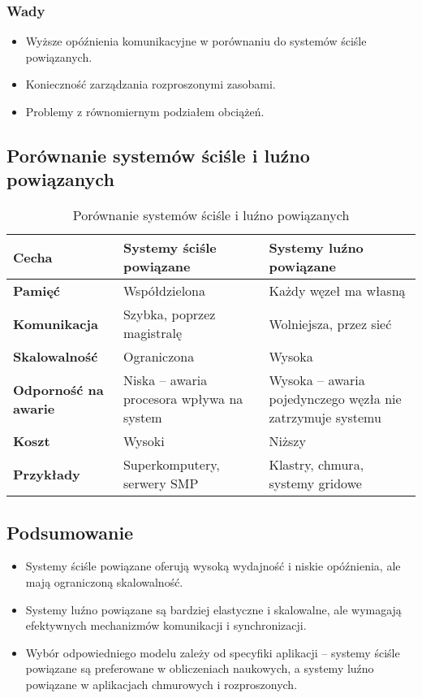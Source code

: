 \subsubsection{Wady}
\begin{itemize}
    \item Wyższe opóźnienia komunikacyjne w porównaniu do systemów ściśle powiązanych.
    \item Konieczność zarządzania rozproszonymi zasobami.
    \item Problemy z równomiernym podziałem obciążeń.
\end{itemize}

\subsection{Porównanie systemów ściśle i luźno powiązanych}

\begin{table}[h]
    \centering
    \renewcommand{\arraystretch}{1.3} %
    \begin{tabularx}{\textwidth}{|l|X|X|}
        \hline
        \textbf{Cecha} & \textbf{Systemy ściśle powiązane} & \textbf{Systemy luźno powiązane} \\
        \hline
        \textbf{Pamięć} & Współdzielona & Każdy węzeł ma własną \\
        \hline
        \textbf{Komunikacja} & Szybka, poprzez magistralę & Wolniejsza, przez sieć \\
        \hline
        \textbf{Skalowalność} & Ograniczona & Wysoka \\
        \hline
        \textbf{Odporność na awarie} & Niska – awaria procesora wpływa na system & Wysoka – awaria pojedynczego węzła nie zatrzymuje systemu \\
        \hline
        \textbf{Koszt} & Wysoki & Niższy \\
        \hline
        \textbf{Przykłady} & Superkomputery, serwery SMP & Klastry, chmura, systemy gridowe \\
        \hline
    \end{tabularx}
    \caption{Porównanie systemów ściśle i luźno powiązanych}
\end{table}


\subsection{Podsumowanie}
\begin{itemize}
    \item Systemy ściśle powiązane oferują wysoką wydajność i niskie opóźnienia, ale mają ograniczoną skalowalność.
    \item Systemy luźno powiązane są bardziej elastyczne i skalowalne, ale wymagają efektywnych mechanizmów komunikacji i synchronizacji.
    \item Wybór odpowiedniego modelu zależy od specyfiki aplikacji – systemy ściśle powiązane są preferowane w obliczeniach naukowych, a systemy luźno powiązane w aplikacjach chmurowych i rozproszonych.
\end{itemize}
